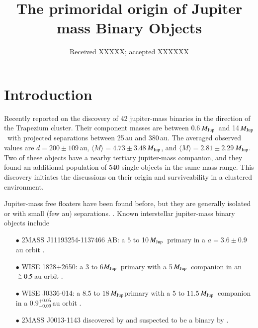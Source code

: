 \documentclass[aa]{aa}
\newcommand{\MJup}{\mbox{${M}_{\rm Jup}$}}
\def\apgt{\ {\raise-.5ex\hbox{$\buildrel>\over\sim$}}\ }
\begin{document}
 

   \title{The primoridal origin of Jupiter mass Binary Objects}
   \date{Received XXXXX; accepted XXXXXX}

  \abstract
   {}
   {}
   {}
   {}
   {}

   \maketitle
   
\section{Introduction}

Recently \cite{2023arXiv231001231P} reported on the discovery of 42
jupiter-mass binaries in the direction of the Trapezium cluster.
Their component masses are between 0.6\,\MJup\, and 14\,\MJup\, with
projected separations between 25\,au and 380\,au.  The averaged
observed values are $d=200\pm109$\,au, $\langle M\rangle =
4.73\pm3.48$\,\MJup, and $\langle M\rangle = 2.81\pm2.29$\,\MJup.
Two of these objects have a nearby tertiary jupiter-mass companion,
and they found an additional population of 540 single objects in the
same mass range. This discovery initiates the discussions on their
origin and surviveability in a clustered environment.

Jupiter-mass free floaters have been found before, but they are
generally isolated or with small (few au) separations.
\cite{2021ApJS..253....7K}.  Known interstellar jupiter-mass binary
objects include
\begin{itemize}
  \item[$\bullet$] 2MASS J11193254-1137466 AB: a $5$
to 10\,\MJup\, primary in a $a=3.6\pm0.9$\,au orbit \cite{2017ApJ...843L...4B}.
  \item[$\bullet$] WISE 1828+2650: a 3 to 6\MJup\, primary with a
    5\,\MJup\ companion in an $\apgt 0.5$\,au orbit
    \cite{2013ApJ...764..101B}.
  \item[$\bullet$] WISE J0336-014: a $8.5$ to $18$\,\MJup primary with
    a $5$ to $11.5$\,\MJup\, companion in a $0.9^{+0.05}_{-0.09}$\,au
    orbit \cite{2023ApJ...947L..30C}.
  \item[$\bullet$] 2MASS J0013-1143 discovered by
    \cite{2017AJ....154..112K} and suspected to be a binary by
    \cite{2019A&A...629A.145E}.
\end{itemize}
\end{document}
